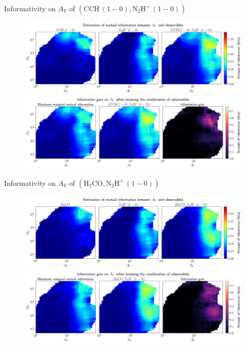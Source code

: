 \documentclass{beamer}
\begin{document}
\begin{frame}{Informativity on $A_V$ of $\left(\mathrm{CCH\,(1-0)},\mathrm{N_2H^+\,(1-0)}\right)$}
    \begin{figure}
        \centering
        \includegraphics[width=0.95\linewidth]{../mi/av__cch10_n2hp10_mi.png}
        \vfill
        \includegraphics[width=0.95\linewidth]{../mi/av__cch10_n2hp10_mi_gain.png}
    \end{figure}
\end{frame}

\begin{frame}{Informativity on $A_V$ of $\left(\mathrm{H_2CO},\mathrm{N_2H^+\,(1-0)}\right)$}
    \begin{figure}
        \centering
        \includegraphics[width=0.95\linewidth]{../mi/av__h2co_n2hp10_mi.png}
        \vfill
        \includegraphics[width=0.95\linewidth]{../mi/av__h2co_n2hp10_mi_gain.png}
    \end{figure}
\end{frame}
\end{document}
